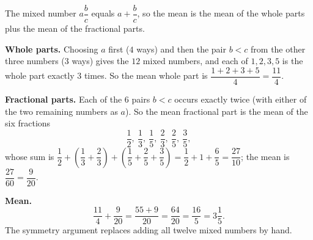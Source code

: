 The mixed number $a\dfrac {b}{c}$ equals $a+\dfrac {b}{c}$, so the mean is the mean of the whole parts plus the mean of the fractional parts.

\textbf{Whole parts.} Choosing $a$ first ($4$ ways) and then the pair $b<c$ from the other three numbers ($3$ ways) gives the $12$ mixed numbers, and each of $1,2,3,5$ is the whole part exactly $3$ times. So the mean whole part is $\dfrac{1+2+3+5}{4}=\dfrac{11}{4}$.

\textbf{Fractional parts.} Each of the $6$ pairs $b<c$ occurs exactly twice (with either of the two remaining numbers as $a$). So the mean fractional part is the mean of the six fractions
\[
\dfrac{1}{2},\ \dfrac{1}{3},\ \dfrac{1}{5},\ \dfrac{2}{3},\ \dfrac{2}{5},\ \dfrac{3}{5},
\]
whose sum is $\dfrac{1}{2}+\left(\dfrac{1}{3}+\dfrac{2}{3}\right)+\left(\dfrac{1}{5}+\dfrac{2}{5}+\dfrac{3}{5}\right)=\dfrac{1}{2}+1+\dfrac{6}{5}=\dfrac{27}{10}$; the mean is $\dfrac{27}{60}=\dfrac{9}{20}$.

\textbf{Mean.}
\[
\dfrac{11}{4}+\dfrac{9}{20}=\dfrac{55+9}{20}=\dfrac{64}{20}=\dfrac{16}{5}=\boxed{3\dfrac{1}{5}}.
\]
The symmetry argument replaces adding all twelve mixed numbers by hand.

